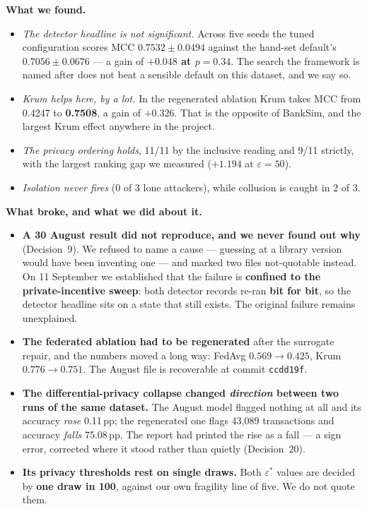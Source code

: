 \documentclass[11pt]{article}
\newcommand{\eps}{\ensuremath{\varepsilon}}
\begin{document}
\textbf{What we found.}
\begin{itemize}\itemsep2pt
  \item \emph{The detector headline is not significant.} Across five seeds the tuned configuration scores
        MCC $0.7532 \pm 0.0494$ against the hand-set default's $0.7056 \pm 0.0676$ --- a gain of
        \textbf{$+0.048$ at $p = 0.34$}. The search the framework is named after does not beat a sensible
        default on this dataset, and we say so.
  \item \emph{Krum \emph{helps} here, by a lot.} In the regenerated ablation Krum takes MCC from 0.4247 to
        \textbf{0.7508}, a gain of $+0.326$. That is the opposite of BankSim, and the largest Krum effect
        anywhere in the project.
  \item \emph{The privacy ordering holds}, 11/11 by the inclusive reading and 9/11 strictly, with the
        largest ranking gap we measured ($+1.194$ at $\eps = 50$).
  \item \emph{Isolation never fires} (0 of 3 lone attackers), while collusion is caught in 2 of 3.
\end{itemize}

\textbf{What broke, and what we did about it.}
\begin{itemize}\itemsep2pt
  \item \textbf{A 30 August result did not reproduce, and we never found out why} (Decision~9). We refused
        to name a cause --- guessing at a library version would have been inventing one --- and marked two
        files not-quotable instead. On 11 September we established that the failure is \textbf{confined to
        the private-incentive sweep}: both detector records re-ran \textbf{bit for bit}, so the detector
        headline sits on a state that still exists. The original failure remains unexplained.
  \item \textbf{The federated ablation had to be regenerated} after the surrogate repair, and the numbers
        moved a long way: FedAvg $0.569 \to 0.425$, Krum $0.776 \to 0.751$. The August file is recoverable
        at commit \texttt{ccdd19f}.
  \item \textbf{The differential-privacy collapse changed \emph{direction} between two runs of the same
        dataset.} The August model flagged nothing at all and its accuracy \emph{rose} 0.11\,pp; the
        regenerated one flags 43{,}089 transactions and accuracy \emph{falls} 75.08\,pp. The report had
        printed the rise as a fall --- a sign error, corrected where it stood rather than quietly
        (Decision~20).
  \item \textbf{Its privacy thresholds rest on single draws.} Both $\eps^*$ values are decided by
        \textbf{one draw in 100}, against our own fragility line of five. We do not quote them.
\end{itemize}
\end{document}
